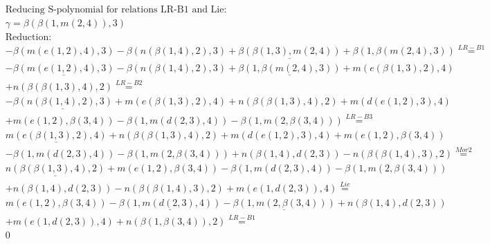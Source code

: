 \documentclass[11pt]{amsart}
\begin{document}
\begin{align*} 
& \text{Reducing S-polynomial for relations LR-B1 and Lie:} \\ 
& \gamma = \beta(\beta(1,m(2,4)),3) \\ 
& \text{Reduction}: \\& - \beta(m(e(1,2),4),3) - \beta(n(\beta(1,4),2),3) + \underline{\beta(\beta(1,3),m(2,4))} + \beta(1,\beta(m(2,4),3)) \stackrel{ LR-B1 }{=}  \\ 
& - \underline{\beta(m(e(1,2),4),3)} - \beta(n(\beta(1,4),2),3) + \underline{\beta(1,\beta(m(2,4),3))} + m(e(\beta(1,3),2),4)\\ 
 &  + n(\beta(\beta(1,3),4),2) \stackrel{ LR-B2 }{=}  \\ 
& - \underline{\beta(n(\beta(1,4),2),3)} + m(e(\beta(1,3),2),4) + n(\beta(\beta(1,3),4),2) + m(d(e(1,2),3),4)\\ 
 &  + m(e(1,2),\beta(3,4)) - \beta(1,m(d(2,3),4)) - \beta(1,m(2,\beta(3,4))) \stackrel{ LR-B3 }{=}  \\ 
&\underline{m(e(\beta(1,3),2),4)} + n(\beta(\beta(1,3),4),2) + m(d(e(1,2),3),4) + m(e(1,2),\beta(3,4))\\ 
 &  - \beta(1,m(d(2,3),4)) - \beta(1,m(2,\beta(3,4))) + n(\beta(1,4),d(2,3)) - n(\beta(\beta(1,4),3),2) \stackrel{ Mor2 }{=}  \\ 
&\underline{n(\beta(\beta(1,3),4),2)} + m(e(1,2),\beta(3,4)) - \beta(1,m(d(2,3),4)) - \beta(1,m(2,\beta(3,4)))\\ 
 &  + n(\beta(1,4),d(2,3)) - n(\beta(\beta(1,4),3),2) + m(e(1,d(2,3)),4) \stackrel{ Lie }{=}  \\ 
&m(e(1,2),\beta(3,4)) - \underline{\beta(1,m(d(2,3),4))} - \underline{\beta(1,m(2,\beta(3,4)))} + n(\beta(1,4),d(2,3))\\ 
 &  + m(e(1,d(2,3)),4) + n(\beta(1,\beta(3,4)),2) \stackrel{ LR-B1 }{=}  \\ 
&0\\ 
\end{align*} 
 
\end{document}
